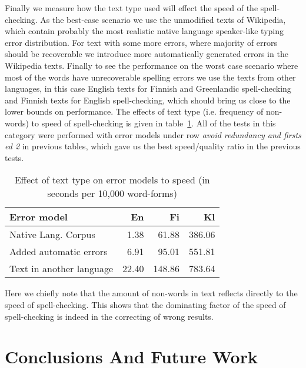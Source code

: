 \documentclass[11pt]{article}
\begin{document}
Finally we measure how the text type used will effect the speed of the
spell-checking. As the best-case scenario we use the unmodified texts of
Wikipedia, which contain probably the most realistic native language
speaker-like typing error distribution. For text with some more errors, where
majority of errors should be recoverable we introduce more automatically
generated errors in the Wikipedia texts. Finally to see the performance on
the worst case scenario where most of the words have unrecoverable
spelling errors
we use the texts from other languages, in this case English texts for Finnish
and Greenlandic spell-checking and Finnish texts for English spell-checking,
which should bring us close to the lower bounds on performance. The
effects of text type (i.e. frequency of non-words) to speed of spell-checking
is given in table~\ref{table:language-vs-text-type}. All of
the tests in this category were performed with error models under row
\emph{avoid redundancy and firsts ed 2} in previous tables, which gave us the
best speed/quality ratio in the previous tests.

\begin{table}[h]
\begin{center}
\begin{scriptsize}
\begin{tabular}{|l|rrr|}
\hline
\bf Error model & \bf En & \bf Fi & \bf Kl  \\ 
\hline
Native Lang. Corpus &
1.38&61.88&386.06
\\
Added automatic errors &
6.91&95.01&551.81
\\
Text in another language &
22.40&148.86&783.64
\\
\hline
\end{tabular}
\end{scriptsize}
\end{center}
\caption{\label{table:language-vs-text-type} Effect of text type on
error models to speed (in seconds per 10,000 word-forms)}
\end{table}

Here we chiefly note that the amount of non-words in text reflects directly to
the speed of spell-checking. This shows that the dominating factor of the
speed of spell-checking is indeed in the correcting of wrong results.

\section{Conclusions And Future Work}
\label{sec:conclusions}
\end{document}
